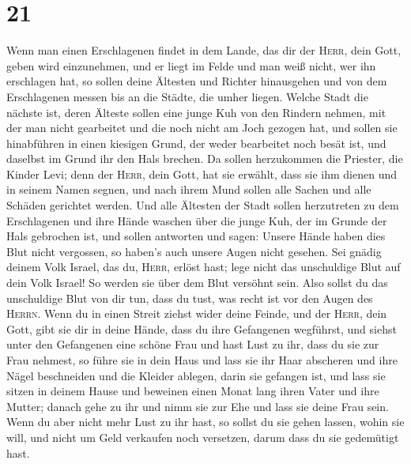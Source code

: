 \hypertarget{section-20}{%
\section{21}\label{section-20}}

 Wenn man einen Erschlagenen findet in dem Lande, das dir
der \textsc{Herr}, dein Gott, geben wird einzunehmen, und er liegt im
Felde und man weiß nicht, wer ihn erschlagen hat,  so
sollen deine Ältesten und Richter hinausgehen und von dem Erschlagenen
messen bis an die Städte, die umher liegen.  Welche Stadt
die nächste ist, deren Älteste sollen eine junge Kuh von den Rindern
nehmen, mit der man nicht gearbeitet und die noch nicht am Joch gezogen
hat,  und sollen sie hinabführen in einen kiesigen Grund,
der weder bearbeitet noch besät ist, und daselbst im Grund ihr den Hals
brechen.  Da sollen herzukommen die Priester, die Kinder
Levi; denn der \textsc{Herr}, dein Gott, hat sie erwählt, dass sie ihm
dienen und in seinem Namen segnen, und nach ihrem Mund sollen alle
Sachen und alle Schäden gerichtet werden.  Und alle
Ältesten der Stadt sollen herzutreten zu dem Erschlagenen und ihre Hände
waschen über die junge Kuh, der im Grunde der Hals gebrochen ist,
 und sollen antworten und sagen: Unsere Hände haben dies
Blut nicht vergossen, so haben's auch unsere Augen nicht gesehen.
 Sei gnädig deinem Volk Israel, das du, \textsc{Herr},
erlöst hast; lege nicht das unschuldige Blut auf dein Volk Israel! So
werden sie über dem Blut versöhnt sein.  Also sollst du
das unschuldige Blut von dir tun, dass du tust, was recht ist vor den
Augen des \textsc{Herrn}.  Wenn du in einen Streit ziehst
wider deine Feinde, und der \textsc{Herr}, dein Gott, gibt sie dir in
deine Hände, dass du ihre Gefangenen wegführst,  und
siehst unter den Gefangenen eine schöne Frau und hast Lust zu ihr, dass
du sie zur Frau nehmest,  so führe sie in dein Haus und
lass sie ihr Haar abscheren und ihre Nägel beschneiden 
und die Kleider ablegen, darin sie gefangen ist, und lass sie sitzen in
deinem Hause und beweinen einen Monat lang ihren Vater und ihre Mutter;
danach gehe zu ihr und nimm sie zur Ehe und lass sie deine Frau sein.
 Wenn du aber nicht mehr Lust zu ihr hast, so sollst du
sie gehen lassen, wohin sie will, und nicht um Geld verkaufen noch
versetzen, darum dass du sie gedemütigt hast.

